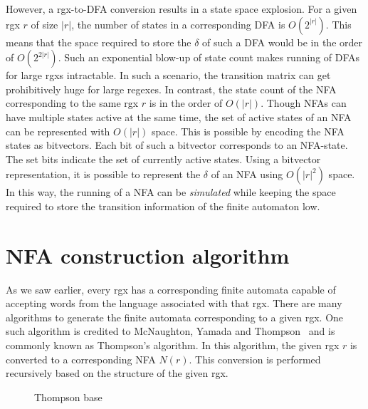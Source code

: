 However, a \gls{rgx}-to-\gls{DFA} conversion results in a state space
explosion.
For a given \gls{rgx} $r$ of size $|r|$, the number of states in a
corresponding \gls{DFA} is $O(2^{|r|})$.
This means that the space required to store the $\delta$ of such a
\gls{DFA} would be in the order of $O(2^{2|r|})$.
Such an exponential blow-up of state count makes running of
\glspl{DFA} for large \glspl{rgx} intractable.
In such a scenario, the transition matrix can get prohibitively huge
for large regexes.
%
In contrast, the state count of the \gls{NFA} corresponding to the
same \gls{rgx} $r$ is in the order of $O(|r|)$.
Though \glspl{NFA} can have multiple states active at the same time,
the set of active states of an \gls{NFA} can be represented with
$O(|r|)$ space.
This is possible by encoding the \gls{NFA} states as bitvectors.
Each bit of such a bitvector corresponds to an \gls{NFA}-state.
The set bits indicate the set of currently active states.
Using a bitvector representation, it is possible to represent the
$\delta$ of an \gls{NFA} using $O(|r|^2)$ space.
In this way, the running of a \gls{NFA} can be \emph{simulated} while
keeping the space required to store the transition information of the
finite automaton low.



\section{NFA construction algorithm} \label{sec:thompson-overview}
As we saw earlier, every \gls{rgx} has a corresponding finite automata
capable of accepting words from the language associated with that
\gls{rgx}.
There are many algorithms to generate the finite automata
corresponding to a given \gls{rgx}.
One such algorithm is credited to McNaughton, Yamada and
Thompson~\cite{mcnaughton1960regular,thompson1968nfa} and is commonly
known as Thompson's algorithm.
In this algorithm, the given \gls{rgx} $r$ is converted to a
corresponding \gls{NFA} $N(r)$.
This conversion is performed recursively based on the structure of the
given \gls{rgx}.

\begin{figure}
  \centering
  
  \caption{Thompson base}
  \label{fa:thompson-base}
\end{figure}


